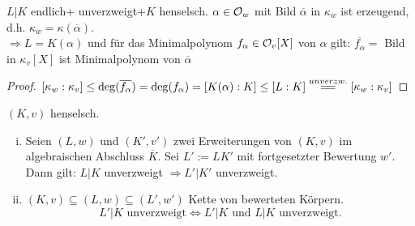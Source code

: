 \begin{Bem}
$L|K$ endlich+ unverzweigt+$K$ henselsch. $\alpha \in \mathcal{O}_w$ mit Bild $\overline{\alpha}$ in $\kappa_w$ ist erzeugend, d.h. $\kappa_w=\kappa(\overline{\alpha})$.\\
$\Rightarrow L=K(\alpha)$ und für das Minimalpolynom $f_\alpha \in \mathcal{O}_v[X]$ von $\alpha$ gilt: $\overline{f_\alpha}=$ Bild in $\kappa_v[X]$ ist Minimalpolynom von $\overline{\alpha}$
\end{Bem}

\begin{proof}
$[\kappa_w:\kappa_v] \leq \deg(\overline{f_\alpha})=\deg(f_\alpha)=[K(\alpha):K] \leq [L:K]\stackrel{unverzw.}{=\joinrel=}[\kappa_w : \kappa_v]$
\end{proof}

\begin{Prop}
$(K,v)$ henselsch.
\begin{enumerate}[i)]
\item Seien $(L,w)$ und $(K',v')$ zwei Erweiterungen von $(K,v)$ im algebraischen Abschluss $\overline{K}$. Sei $L':=LK'$ mit fortgesetzter Bewertung $w'$. Dann gilt: $L|K$ unverzweigt $\Rightarrow L'|K'$ unverzweigt.
\item $(K,v) \subseteq (L,w) \subseteq (L',w')$ Kette von bewerteten Körpern.
\[L'|K \text{ unverzweigt} \iff L'|K \text{ und } L|K \text{ unverzweigt}.\]
\end{enumerate}
\end{Prop}